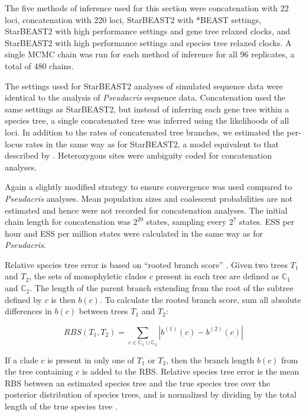 \documentclass[nogrid]{MBE}%
\begin{document}
The five methods of inference used for this section were concatenation with 22
loci, concatenation with 220 loci, StarBEAST2 with *BEAST settings, StarBEAST2
with high performance settings and gene tree relaxed clocks, and StarBEAST2 with
high performance settings and species tree relaxed clocks. A single MCMC chain was
run for each method of inference for all 96 replicates, a total of 480 chains.

The settings used for StarBEAST2 analyses of simulated sequence data were
identical to the analysis of \textit{Pseudacris} sequence data. Concatenation
used the same settings as StarBEAST2, but instead of inferring each gene tree
within a species tree, a single concatenated tree was inferred using the
likelihoods of all loci. In addition to the rates of concatenated tree branches,
we estimated the per-locus rates in the same way as for StarBEAST2, a model
equivalent to that described by \cite{Rasmussen01122007}. Heterozygous sites
were ambiguity coded for concatenation analyses.

Again a slightly modified strategy to ensure convergence was used compared to
\textit{Pseudacris} analyses. Mean population sizes and coalescent probabilities
are not estimated and hence were not recorded for concatenation analyses. The
initial chain length for concatenation was $2^{20}$ states, sampling every
$2^{7}$ states. ESS per hour
and ESS per million states were calculated in the same way as for
\textit{Pseudacris}.

Relative species tree error is based on ``rooted branch score''
\citep[RBS;][]{Heled2013}. Given two trees $T_1$ and $T_2$, the sets of
monophyletic clades $c$ present in each tree are defined as $\mathbb{C}_1$ and
$\mathbb{C}_2$. The length of the parent branch extending from the root of the
subtree defined by $c$ is then $b(c)$. To calculate the rooted branch score, sum
all absolute differences in $b(c)$ between trees $T_1$ and $T_2$:

\begin{equation}
RBS(T_1, T_2) = \sum_{c \in {\mathbb{C}_1} \cup {\mathbb{C}_2}} |b^{(1)}(c) - b^{(2)}(c)|
\end{equation}

If a clade $c$ is present in only one of $T_1$ or $T_2$, then the branch length
$b(c)$ from the tree containing $c$ is added to the RBS. Relative species tree
error is the mean RBS between an estimated species tree and the true
species tree over the posterior distribution of species trees, and is normalized
by dividing by the total length of the true species tree
\citep{Ogilvie01052016}.
\end{document}
